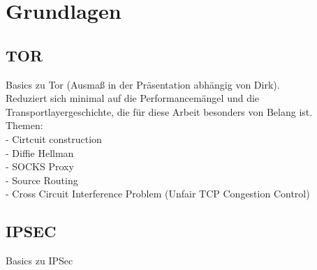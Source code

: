 \section{Grundlagen}

\subsection{TOR}

Basics zu Tor (Ausmaß in der Präsentation abhängig von Dirk).\\
Reduziert sich minimal auf die Performancemängel und die Transportlayergeschichte, die für diese Arbeit besonders von Belang ist. \\
Themen:\\
- Cirtcuit construction\\
- Diffie Hellman\\
- SOCKS Proxy\\
- Source Routing\\
- Cross Circuit Interference Problem (Unfair TCP Congestion Control)\\

\subsection{IPSEC}

Basics zu IPSec\\